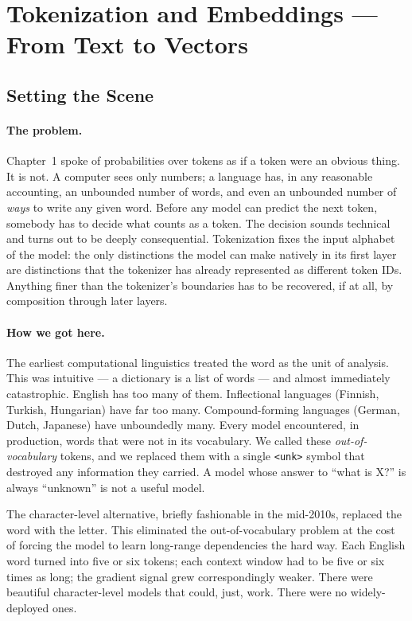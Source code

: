 \section{Tokenization and Embeddings — From Text to Vectors}
\label{sec:week3-tokemb}

\subsection*{Setting the Scene}

\paragraph{The problem.} Chapter~1 spoke of probabilities over
tokens as if a token were an obvious thing. It is not. A computer
sees only numbers; a language has, in any reasonable accounting,
an unbounded number of words, and even an unbounded number of
\emph{ways} to write any given word. Before any model can predict
the next token, somebody has to decide what counts as a token. The
decision sounds technical and turns out to be deeply
consequential. Tokenization fixes the input alphabet of the model:
the only distinctions the model can make natively in its first
layer are distinctions that the tokenizer has already represented
as different token IDs. Anything finer than the tokenizer's
boundaries has to be recovered, if at all, by composition through
later layers.

\paragraph{How we got here.} The earliest computational
linguistics treated the word as the unit of analysis. This was
intuitive --- a dictionary is a list of words --- and almost
immediately catastrophic. English has too many of them.
Inflectional languages (Finnish, Turkish, Hungarian) have far too
many. Compound-forming languages (German, Dutch, Japanese) have
unboundedly many. Every model encountered, in production, words
that were not in its vocabulary. We called these
\emph{out-of-vocabulary} tokens, and we replaced them with a
single \texttt{<unk>} symbol that destroyed any information they
carried. A model whose answer to ``what is X?'' is always
``unknown'' is not a useful model.

The character-level alternative, briefly fashionable in the
mid-2010s, replaced the word with the letter. This eliminated the
out-of-vocabulary problem at the cost of forcing the model to
learn long-range dependencies the hard way. Each English word
turned into five or six tokens; each context window had to be
five or six times as long; the gradient signal grew correspondingly
weaker. There were beautiful character-level models that could,
just, work. There were no widely-deployed ones.

